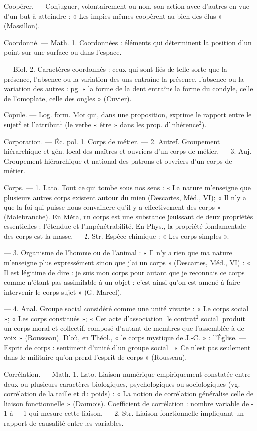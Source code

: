 Coopérer. — Conjuguer, volontairement ou non, son action avec d’autres en vue d'un but à atteindre :
« Les impies mêmes coopèrent au
bien des élus » (Massillon).

Coordonné. — Math. 1. Coordonnées :
éléments qui déterminent la position d’un point sur une surface ou
dans l’espace.

— Biol. 2. Caractères coordonnés :
ceux qui sont liés de telle sorte que
la présence, l’absence ou la variation
des uns entraîne la présence, l’absence ou la variation des autres : pg.
« la forme de la dent entraîne la
forme du condyle, celle de l’omoplate, celle des ongles » (Cuvier).

Copule. — Log. form. Mot qui, dans
une proposition, exprime le rapport
entre le sujet$^2$ et l’attribut$^1$ (le verbe
« être » dans les prop. d’inhérence$^2$).

Corporation. — Éc. pol. 1. Corps de
métier. — 2. Autref. Groupement
hiérarchique et gén. local des maîtres et ouvriers d’un corps de métier.
— 3. Auj. Groupement hiérarchique
et national des patrons et ouvriers
d'un corps de métier.

Corps. — 1. Lato. Tout ce qui tombe
sous nos sens : « La nature m'enseigne que plusieurs autres corps
existent autour du mien (Descartes,
Méd., VI); « Il n’y a que la foi qui
puisse nous convaincre qu'il y a
effectivement des corps » (Malebranche). En Méta, un corps est
une substance jouissant de deux
propriétés essentielles : l'étendue et
l'impénétrabilité. En Phys., la propriété fondamentale des corps est la
masse. — 2. Str. Espèce chimique :
« Les corps simples ».

— 3. Organisme de l’homme ou
de l’animal : « Il n’y a rien que ma
nature m'enseigne plus expressément sinon que j’ai un corps » (Descartes, Méd., VI) : « Il est légitime
de dire : je suis mon corps pour
autant que je reconnais ce corps
comme n'étant pas assimilable à
un objet : c’est ainsi qu’on est amené
à faire intervenir le corps-sujet »
(G. Marcel).

— 4. Anal. Groupe social considéré comme une unité vivante : « Le
corps social »; « Les corps constitués »; « Cet acte d'association [le
contrat$^2$ social] produit un corps
moral et collectif, composé d’autant
de membres que l’assemblée à de
voix » (Rousseau). D’où, en Théol.,
« le corps mystique de J.-C. » :
l'Église. — Esprit de corps : sentiment d'unité d’un groupe social :
« Ce n’est pas seulement dans le militaire qu'on prend l'esprit de corps »
(Rousseau).

Corrélation. — Math. 1. Lato. Liaison
numérique empiriquement constatée
entre deux ou plusieurs caractères
biologiques, psychologiques ou sociologiques (vg. corrélation de la taille
et du poids) : « La notion de corrélation généralise celle de liaison
fonctionnelle » (Darmois). Coefficient de corrélation : nombre variable de - 1 à + 1 qui mesure cette
liaison. — 2. Str. Liaison fonctionnelle
impliquant un rapport de causalité entre les variables.

